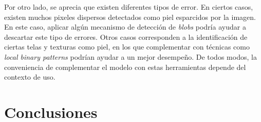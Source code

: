 \documentclass[12pt]{article}
\begin{document}
Por otro lado, se aprecia que existen diferentes tipos de error. En ciertos
casos, existen muchos pixeles dispersos detectados como piel esparcidos por la
imagen. En este caso, aplicar algún mecanismo de detección de \emph{blobs}
podría ayudar a descartar este tipo de errores. Otros casos corresponden a la
identificación de ciertas telas y texturas como piel, en los que complementar
con técnicas como \emph{local binary patterns} podrían ayudar a un mejor
desempeño. De todos modos, la conveniencia de complementar el modelo con estas
herramientas depende del contexto de uso.

\section{Conclusiones}







\end{document}
